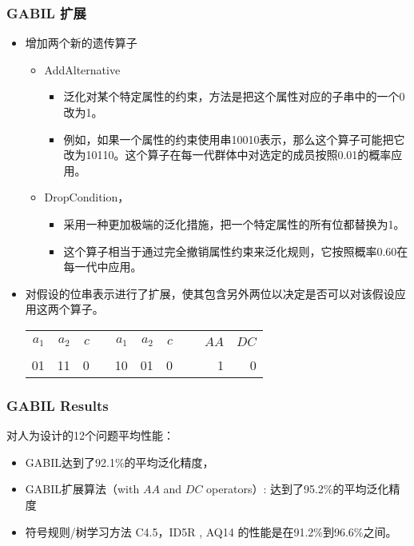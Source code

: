 \documentclass{beamer}
\begin{document}
\begin{frame}
\frametitle{GABIL 扩展}
\label{sec-4-3}


\begin{itemize}
\item 增加两个新的遗传算子
\begin{itemize}
\item AddAlternative
\begin{itemize}
\item 泛化对某个特定属性的约束，方法是把这个属性对应的子串中的一个0改为1。
\item 例如，如果一个属性的约束使用串10010表示，那么这个算子可能把它改为10110。这个算子在每一代群体中对选定的成员按照0.01的概率应用。
\end{itemize}
\item DropCondition，
\begin{itemize}
\item 采用一种更加极端的泛化措施，把一个特定属性的所有位都替换为1。
\item 这个算子相当于通过完全撤销属性约束来泛化规则，它按照概率0.60在每一代中应用。
\end{itemize}
\end{itemize}
\item 对假设的位串表示进行了扩展，使其包含另外两位以决定是否可以对该假设应用这两个算子。

\begin{center}
\begin{tabular}{rrrlrrrlrr}
 $a_{1}$  &  $a_{2}$  &  $c$  &     &  $a_{1}$  &  $a_{2}$  &  $c$  &  \  &  $AA$  &  $DC$  \\
      01  &       11  &    0  &     &       10  &       01  &    0  &  \  &     1  &     0  \\
\end{tabular}
\end{center}


\end{itemize}
\end{frame}
\begin{frame}
\frametitle{GABIL Results}
\label{sec-4-4}


对人为设计的12个问题平均性能：
\begin{itemize}
\item GABIL达到了92.1\%的平均泛化精度，
\item GABIL扩展算法（with $AA$ and $DC$ operators）: 达到了95.2\%的平均泛化精度
\item 符号规则/树学习方法 C4.5，ID5R , AQ14 的性能是在91.2\%到96.6\%之间。
\end{itemize}
\end{frame}
\end{document}
